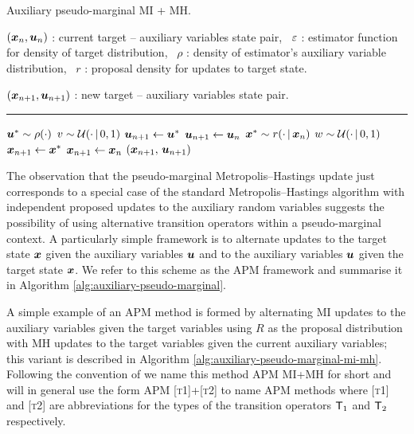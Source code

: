 \begin{algorithm}[!t]
\caption{Auxiliary pseudo-marginal MI + MH.}
\label{alg:auxiliary-pseudo-marginal-mi-mh}
\begin{algorithmic}
\small
    \Require
    $(\boldsymbol{x}_n, \boldsymbol{u}_n)$ : current target -- auxiliary variables state pair,~
    $\varepsilon$ : estimator function for density of target distribution,~
    $\rho$ : density of estimator's auxiliary variable distribution,~
    $r$ : proposal density for updates to target state.
    \Ensure\raggedright
    $(\boldsymbol{x}_{n+1}, \boldsymbol{u}_{n+1})$ : new target -- auxiliary variables state pair.
\end{algorithmic}
\hrule
\small
\begin{algorithmic}[1]
  \State $\boldsymbol{u}^* \sim \rho(\cdot)$ 
  \State $v \sim \mathcal{U}(\cdot \operatorname{|} 0,1)$
    \State $\boldsymbol{u}_{n+1} \gets \boldsymbol{u}^*$
  \Else
    \State $\boldsymbol{u}_{n+1} \gets \boldsymbol{u}_n$
  \EndIf
  \State $\boldsymbol{x}^* \sim r(\cdot \operatorname{|} \boldsymbol{x}_n)$ 
  \State $w \sim \mathcal{U}(\cdot \operatorname{|} 0,1)$
    \State $\boldsymbol{x}_{n+1} \gets \boldsymbol{x}^*$
  \Else
    \State  $\boldsymbol{x}_{n+1} \gets \boldsymbol{x}_n$
  \EndIf
  \State \Return $(\boldsymbol{x}_{n+1},\,\boldsymbol{u}_{n+1})$
\end{algorithmic}
\end{algorithm}
\vspace{-2mm}

The observation that the pseudo-marginal Metropolis--Hastings update just corresponds to a special case of the standard Metropolis--Hastings algorithm with independent proposed updates to the auxiliary random variables suggests the possibility of using alternative transition operators within a pseudo-marginal context. A particularly simple framework is to alternate updates to the target state $\boldsymbol{x}$ given the auxiliary variables $\boldsymbol{u}$ and to the auxiliary variables $\boldsymbol{u}$ given the target state $\boldsymbol{x}$. We refer to this scheme as the \ac{APM} framework and summarise it in Algorithm \ref{alg:auxiliary-pseudo-marginal}.

A simple example of an \ac{APM} method is formed by alternating \ac{MI} updates to the auxiliary variables given the target variables using $R$ as the proposal distribution with \ac{MH} updates to the target variables given the current auxiliary variables; this variant is described in Algorithm \ref{alg:auxiliary-pseudo-marginal-mi-mh}. Following the convention of \citep{murray2016pseudo} we name this method \ac{APM} \ac{MI}+\ac{MH} for short and will in general use the form \ac{APM} \textsc{[t1]}+\textsc{[t2]} to name \ac{APM} methods where \textsc{[t1]} and \textsc{[t2]} are abbreviations for the types of the transition operators $\mathsf{T}_1$ and $\mathsf{T}_2$ respectively. 

